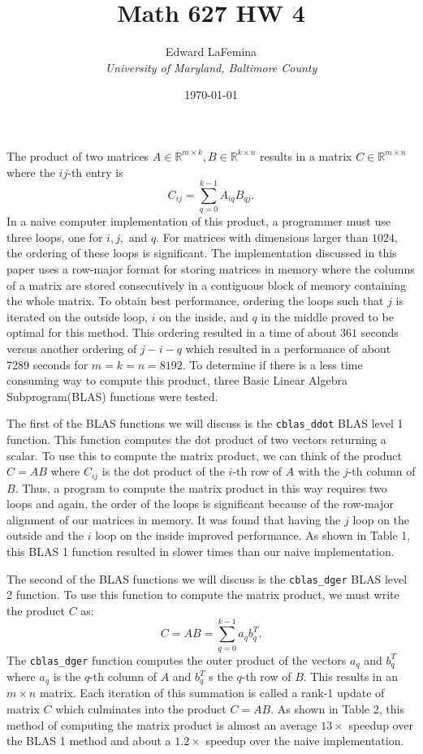 \documentclass[11pt]{article}
\author{Edward LaFemina \\
		\it{University of Maryland, Baltimore County}}
\title{Math 627 HW 4}
\date{\today}
\begin{document}
\maketitle
\pagebreak

The product of two matrices $ A \in \mathbb{R}^{m \times k}, B \in \mathbb{R}^{k \times n} $ results in a matrix $ C \in \mathbb{R}^{m \times n} $ where the $ij$-th entry is
$$ C_{ij} = \sum_{q=0}^{k-1} A_{iq}B_{qj}. $$
In a naive computer implementation of this product, a programmer must use three loops, one for $i, j,$ and $q$. For matrices with dimensions larger than $1024$, the ordering of these loops is significant. The implementation discussed in this paper uses a row-major format for storing matrices in memory where the columns of a matrix are stored consecutively in a contiguous block of memory containing the whole matrix. To obtain best performance, ordering the loops such that $j$ is iterated on the outside loop, $i$ on the inside, and $q$ in the middle proved to be optimal for this method. This ordering resulted in a time of about $361$ seconds versus another ordering of $j-i-q$ which resulted in a performance of about 7289 seconds for $m=k=n=8192$. To determine if there is a less time consuming way to compute this product, three Basic Linear Algebra Subprogram(BLAS) functions were tested.

The first of the BLAS functions we will discuss is the \texttt{cblas\_ddot} BLAS level 1 function. This function computes the dot product of two vectors returning a scalar. To use this to compute the matrix product, we can think of the product $ C = AB $ where $ C_{ij} $ is the dot product of the $i$-th row of $A$ with the $j$-th column of $B$. Thus, a program to compute the matrix product in this way requires two loops and again, the order of the loops is significant because of the row-major alignment of our matrices in memory. It was found that having the $j$ loop on the outside and the $i$ loop on the inside improved performance. As shown in Table 1, this BLAS 1 function resulted in slower times than our naive implementation.

The second of the BLAS functions we will discuss is the \texttt{cblas\_dger} BLAS level 2 function. To use this function to compute the matrix product, we must write the product $C$ as:
$$ C = AB = \sum_{q=0}^{k-1} {a_{q}b_{q}^{T}}. $$
The \texttt{cblas\_dger} function computes the outer product of the vectors $a_{q}$ and ${b_{q}^{T}}$ where $a_{q}$ is the $q$-th column of $A$ and ${b_{q}^{T}}$ s the $q$-th row of $B$. This results in an $m \times n$ matrix. Each iteration of this summation is called a rank-1 update of matrix $C$ which culminates into the product $C=AB$. As shown in Table 2, this method of computing the matrix product is almost an average $13\times$ speedup over the BLAS 1 method and about a $1.2\times$ speedup over the naive implementation.
\end{document}

